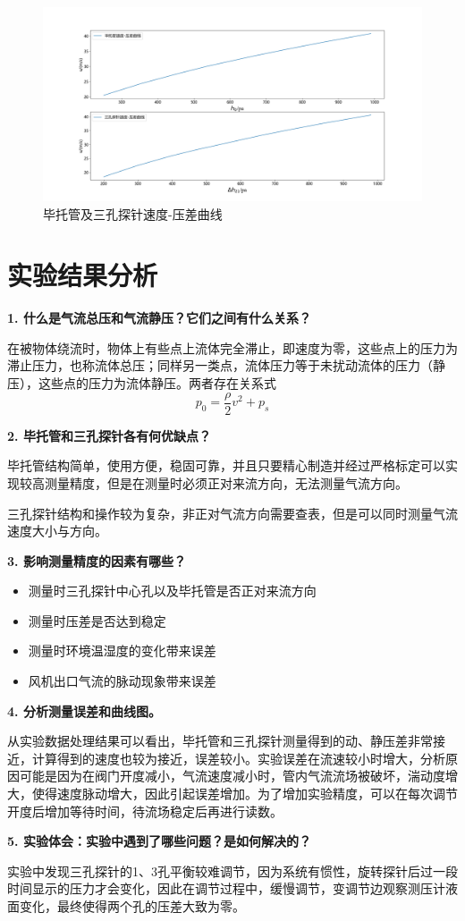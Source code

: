 \documentclass[UTF8]{article}
\begin{document}
	\begin{figure}[H]
		\centering
		\includegraphics[width=\linewidth]{figure/Figure_1}
		\caption{毕托管及三孔探针速度-压差曲线}
		\label{fig:figure1}
	\end{figure}
	\section{实验结果分析}
	\textbf{1.	什么是气流总压和气流静压？它们之间有什么关系？}
	
	在被物体绕流时，物体上有些点上流体完全滞止，即速度为零，这些点上的压力为滞止压力，也称流体总压；同样另一类点，流体压力等于未扰动流体的压力（静压），这些点的压力为流体静压。两者存在关系式
	\[
	p_0 = \frac{\rho}{2}v^2+p_s
	\]
	
	\textbf{2.	毕托管和三孔探针各有何优缺点？}
	
	毕托管结构简单，使用方便，稳固可靠，并且只要精心制造并经过严格标定可以实现较高测量精度，但是在测量时必须正对来流方向，无法测量气流方向。
	
	三孔探针结构和操作较为复杂，非正对气流方向需要查表，但是可以同时测量气流速度大小与方向。
	
	\textbf{3.	影响测量精度的因素有哪些？}
	
	\begin{itemize}
		\item 测量时三孔探针中心孔以及毕托管是否正对来流方向
		\item 测量时压差是否达到稳定
		\item 测量时环境温湿度的变化带来误差
		\item 风机出口气流的脉动现象带来误差
	\end{itemize}

	\textbf{4.	分析测量误差和曲线图。}
	
	从实验数据处理结果可以看出，毕托管和三孔探针测量得到的动、静压差非常接近，计算得到的速度也较为接近，误差较小。实验误差在流速较小时增大，分析原因可能是因为在阀门开度减小，气流速度减小时，管内气流流场被破坏，湍动度增大，使得速度脉动增大，因此引起误差增加。为了增加实验精度，可以在每次调节开度后增加等待时间，待流场稳定后再进行读数。
	
	\textbf{5.	实验体会：实验中遇到了哪些问题？是如何解决的？}
	
	实验中发现三孔探针的1、3孔平衡较难调节，因为系统有惯性，旋转探针后过一段时间显示的压力才会变化，因此在调节过程中，缓慢调节，变调节边观察测压计液面变化，最终使得两个孔的压差大致为零。
	
\end{document}
